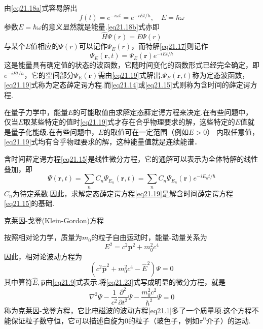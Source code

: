 由\eqref{eq21.18a}式容易解出
\begin{equation*}
	f(t)=e^{-i\omega t}=e^{-iEt/h},\quad E=\hbar\omega
\end{equation*}
参数$E=\hbar\omega$的意义显然就是能量.\eqref{eq21.18b}式亦即
\begin{equation}\label{eq21.19}
	\hat{H}\varPsi(r)=E\varPsi(r)
\end{equation}
与某个$E$值相应的$\varPsi(r)$可以记作$\varPsi_{E}(r)$，而特解\eqref{eq21.17}则记作
\begin{equation}\label{eq21.20}
	\varPsi_{E}(\boldsymbol{r},t)=\varPsi_{E}(\boldsymbol{r})e^{-iEt/\hbar}
\end{equation}\eqlong
这是能量具有确定值的状态的波函数，它随时间变化的函数形式已经完全确定，即$e^{-iEt/h}$，它的空间部分$\varPsi_{E}(\boldsymbol{r})$需由\eqref{eq21.19}式解出.$\varPsi_{E}(\boldsymbol{r},t)$称为定态波函数，\eqref{eq21.19}式称为定态薛定谔方程.而\eqref{eq21.14}或\eqref{eq21.15}式则称为含时间的薛定谔方程.

在量子力学中，能量$E$的可能取值由求解定态薛定谔方程来决定.在有些问题中，仅当$E$取某些特定的值时\eqref{eq21.19}式才存在合乎物理要求的解，这些特定的$E$值就是量子化能级.在有些问题中，$E$的取值可在一定范围（例如$E>0$） 内取任意值，\eqref{eq21.19}式均有合乎物理要求的解，这种能量值就是连续能谱．

含时间薛定谔方程\eqref{eq21.15}是线性微分方程，它的通解可以表示为全体特解的线性叠加，即
\begin{equation}\label{eq21.21}
	\varPsi(\boldsymbol{r},t)=\sum_{n}C_{n}\varPsi_{E_{n}}(\boldsymbol{r},t)
	=\sum_{n}C_{n}\varPsi_{E_{n}}(\boldsymbol{r})e^{-iE_{n}t/\hbar}
\end{equation}\eqshort
$C_{n}$为待定系数.因此，求解定态薛定谔方程\eqref{eq21.19}是解含时间薛定谔方程\eqref{eq21.15}的基础.

\example 克莱因-戈登(Klein-Gordon)方程

按照相对论力学，质量为$m_{0}$的粒子自由运动时，能量-动量关系为
\begin{equation}\label{eq21.22}
	E^{2}=c^{2}\boldsymbol{p}^{2}+m_{0}^{2}c^{4}
\end{equation}\eqnormal
因此，相对论波动方程为
\begin{equation}\label{eq21.23}
	(c^{2}\hat{\boldsymbol{p}}^{2}+m_{0}^{2}c^{4}-\hat{E}^{2} )\varPsi=0
\end{equation}
其中算符$\hat{E},\hat{\boldsymbol{p}}$由\eqref{eq21.9}式表示.将\eqref{eq21.23}式写成明显的微分方程，就是
\begin{equation}\label{eq21.24}
	\nabla^{2}\varPsi-\frac{1}{c^{2}}\frac{\partial^{2}}{\partial t^{2}}\varPsi-\frac{m_{0}^{2}c^{2}}{\hbar^{2}}\varPsi=0
\end{equation}
称为克莱因-戈登方程，它比电磁波的波动方程\eqref{eq21.1}多了一个质量项.这个方程不能保证粒子数守恒，它可以描述自旋为0的粒子（玻色子，例如$\pi^{0}$介子）的运动.

